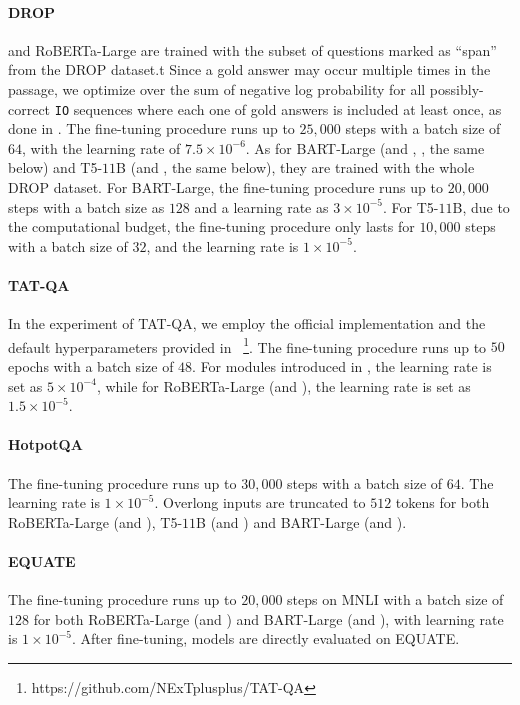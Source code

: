 \paragraph{DROP}
\oursroberta and RoBERTa-Large are trained with the subset of questions marked as ``span'' from the DROP dataset.t
Since a gold answer may occur multiple times in the passage, we optimize over the sum of negative log probability for all possibly-correct \texttt{IO} sequences where each one of gold answers is included at least once, as done in \citet{segal-etal-2020-simple}.
The fine-tuning procedure runs up to $25,000$ steps with a batch size of $64$, with the learning rate of $7.5{\times}{10}^{-6}$.
As for BART-Large (and \oursbart, \oursbartmath, the same below) and T5-$11$B (and \ourstfive, the same below), they are trained with the whole DROP dataset.
For BART-Large, the fine-tuning procedure runs up to $20,000$ steps with a batch size as $128$ and a learning rate as $3{\times}{10}^{-5}$.
For T5-$11$B, due to the computational budget, the fine-tuning procedure only lasts for $10,000$ steps with a batch size of $32$, and the learning rate is $1{\times}{10}^{-5}$.


\paragraph{TAT-QA}

In the experiment of TAT-QA, we employ the official implementation and the default hyperparameters provided in \tagop~\footnote{https://github.com/NExTplusplus/TAT-QA}.
The fine-tuning procedure runs up to $50$ epochs with a batch size of $48$.
For modules introduced in \tagop, the learning rate is set as $5{\times}{10}^{-4}$, while for RoBERTa-Large (and \oursroberta), the learning rate is set as $1.5{\times}{10}^{-5}$.

\paragraph{HotpotQA}

The fine-tuning procedure runs up to $30,000$ steps with a batch size of $64$. The learning rate is $1{\times}{10}^{-5}$. Overlong inputs are truncated to $512$ tokens for both RoBERTa-Large (and \oursroberta), T5-$11$B (and \ourstfive) and BART-Large (and \oursbart). 

\paragraph{EQUATE}
The fine-tuning procedure runs up to $20,000$ steps on MNLI with a batch size of $128$ for both RoBERTa-Large (and \oursroberta) and BART-Large (and \oursbart), with learning rate is $1{\times}{10}^{-5}$. After fine-tuning, models are directly evaluated on EQUATE.


